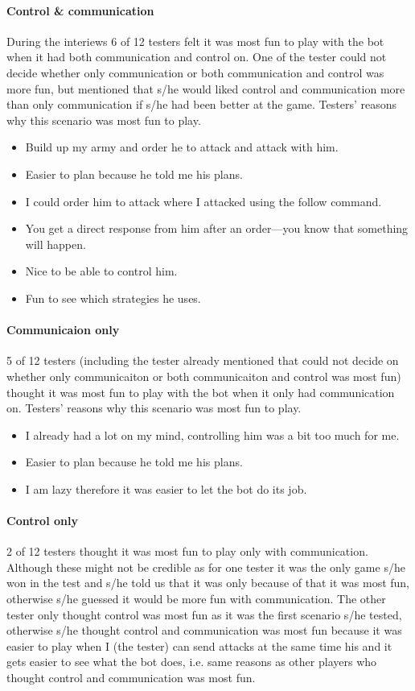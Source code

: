 \paragraph{Control \& communication}
During the interiews 6 of 12 testers felt it was most fun to play with the bot when it had both communication and control on. One of the tester could not decide whether only communication or both communication and control was more fun, but mentioned that s/he would liked control and communication more than only communication if s/he had been better at the game. Testers' reasons why this scenario was most fun to play.
\begin{itemize}
	\item Build up my army and order he to attack and attack with him.
	\item Easier to plan because he told me his plans.
	\item I could order him to attack where I attacked using the follow command.
	\item You get a direct response from him after an order—you know that something will happen.
	\item Nice to be able to control him.
	\item Fun to see which strategies he uses.
\end{itemize}

\paragraph{Communicaion only}
5 of 12 testers (including the tester already mentioned that could not decide on whether only communicaiton or both communicaiton and control was most fun) thought it was most fun to play with the bot when it only had communication on. Testers' reasons why this scenario was most fun to play.
\begin{itemize}
	\item I already had a lot on my mind, controlling him was a bit too much for me.	
	\item Easier to plan because he told me his plans.
	\item I am lazy therefore it was easier to let the bot do its job.
\end{itemize}

\paragraph{Control only}
2 of 12 testers thought it was most fun to play only with communication. Although these might not be credible as for one tester it was the only game s/he won in the test and s/he told us that it was only because of that it was most fun, otherwise s/he guessed it would be more fun with communication. The other tester only thought control was most fun as it was the first scenario s/he tested, otherwise s/he thought control and communication was most fun because it was easier to play when I (the tester) can send attacks at the same time his and it gets easier to see what the bot does, i.e. same reasons as other players who thought control and communication was most fun.

